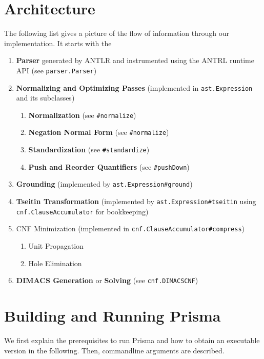 \documentclass{llncs}
\begin{document}
\section{Architecture}
\label{sec:arch}

The following list gives a picture of the flow of information through our implementation. It starts with the 

\begin{enumerate}
	\item{\textbf{Parser} generated by ANTLR and instrumented using the ANTRL runtime API (see \texttt{parser.Parser})}
	\item{\textbf{Normalizing and Optimizing Passes} (implemented in \texttt{ast.Expression} and its subclasses)
		\begin{enumerate}
			\item{\textbf{Normalization} (see \texttt{\#normalize})}
			\item{\textbf{Negation Normal Form} (see \texttt{\#normalize})}
			\item{\textbf{Standardization} (see \texttt{\#standardize})}
			\item{\textbf{Push and Reorder Quantifiers} (see \texttt{\#pushDown})}
		\end{enumerate}
	}
	\item{\textbf{Grounding} (implemented by \texttt{ast.Expression\#ground})}
	\item{\textbf{Tseitin Transformation} (implemented by \texttt{ast.Expression\#tseitin} using \texttt{cnf.ClauseAccumulator} for bookkeeping)}
	\item{CNF Minimization (implemented in \texttt{cnf.ClauseAccumulator\#compress})
		\begin{enumerate}
			\item{Unit Propagation}
			\item{Hole Elimination}
		\end{enumerate}
	}
	\item{\textbf{DIMACS Generation} or \textbf{Solving} (see \texttt{cnf.DIMACSCNF})}
\end{enumerate}

\section{Building and Running Prisma}
\label{sec:buildnrun}

We first explain the prerequisites to run Prisma and how to obtain an executable version in the following. Then, commandline arguments are described.
\end{document}
